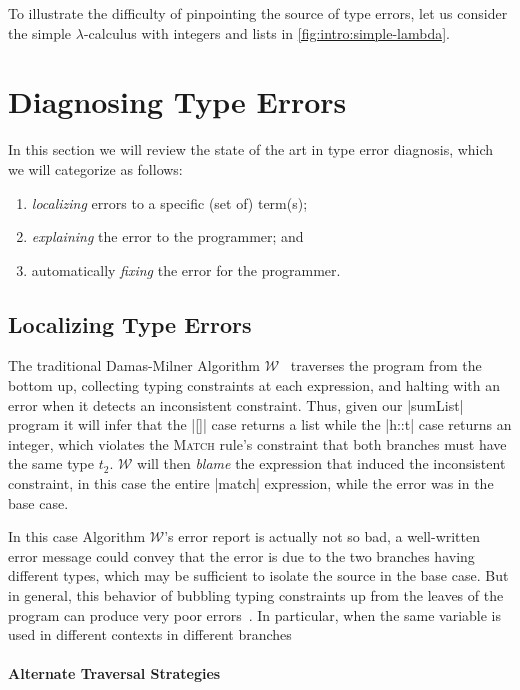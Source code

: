 To illustrate the difficulty of pinpointing the source of type errors,
let us consider the simple $\lambda$-calculus with integers and lists in
\autoref{fig:intro:simple-lambda}.

\section{Diagnosing Type Errors}
\label{sec:diagnosing-type-errors}
In this section we will review the state of the art in type error
diagnosis, which we will categorize as follows:
\begin{enumerate}
\item \emph{localizing} errors to a specific (set of) term(s);
\item \emph{explaining} the error to the programmer; and
\item automatically \emph{fixing} the error for the programmer.
\end{enumerate}

\subsection{Localizing Type Errors}
\label{sec:localizing-type-errors}

The traditional Damas-Milner Algorithm $\mathcal{W}$~\citep{Damas1982-uw}
traverses the program from the bottom up, collecting typing constraints
at each expression, and halting with an error when it detects an
inconsistent constraint.
%
Thus, given our |sumList| program it will infer that the |[]| case
returns a list while the |h::t| case returns an integer, which violates
the \textsc{Match} rule's constraint that both branches must have the
same type $t_2$.
%
$\mathcal{W}$ will then \emph{blame} the expression that induced the
inconsistent constraint, in this case the entire |match| expression,
while the error was in the base case.

In this case Algorithm $\mathcal{W}$'s error report is actually not so
bad, a well-written error message could convey that the error is due to
the two branches having different types, which may be sufficient to
isolate the source in the base case.
%
But in general, this behavior of bubbling typing constraints up from the
leaves of the program can produce very poor errors~\citep{Wand1986-nw}.
%
In particular, when the same variable is used in different contexts in
different branches 

\paragraph{Alternate Traversal Strategies}

